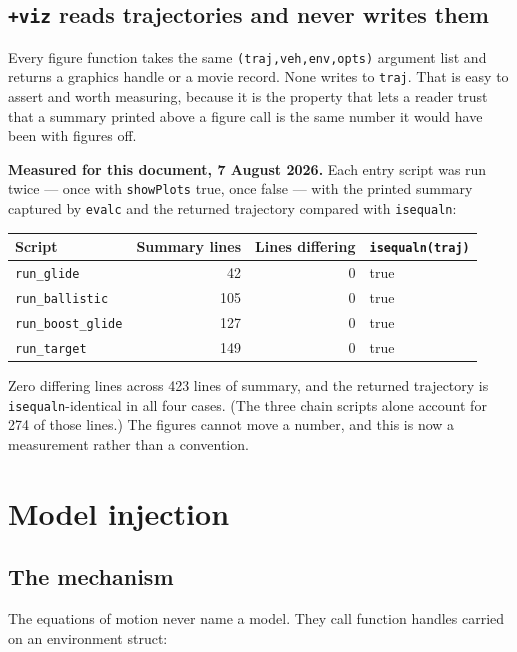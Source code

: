 \documentclass[11pt]{article}
\newcommand{\code}[1]{\texttt{#1}}
\newcommand{\pkg}[1]{\texttt{+#1}}
\begin{document}
\subsection{\pkg{viz} reads trajectories and never writes them}
\label{sec:vizreadonly}

Every figure function takes the same \code{(traj,veh,env,opts)} argument list
and returns a graphics handle or a movie record. None writes to \code{traj}.
That is easy to assert and worth measuring, because it is the property that
lets a reader trust that a summary printed above a figure call is the same
number it would have been with figures off.

\textbf{Measured for this document, 7 August 2026.} Each entry script was run
twice --- once with \code{showPlots} true, once false --- with the printed
summary captured by \code{evalc} and the returned trajectory compared with
\code{isequaln}:

\begin{center}
\begin{tabular}{lrrl}
\toprule
Script & Summary lines & Lines differing & \code{isequaln(traj)} \\
\midrule
\code{run\_glide}       &  42 & 0 & true \\
\code{run\_ballistic}   & 105 & 0 & true \\
\code{run\_boost\_glide}& 127 & 0 & true \\
\code{run\_target}      & 149 & 0 & true \\
\bottomrule
\end{tabular}
\end{center}

Zero differing lines across 423 lines of summary, and the returned trajectory
is \code{isequaln}-identical in all four cases. (The three chain scripts alone
account for 274 of those lines.) The figures cannot move a number, and this is
now a measurement rather than a convention.

\section{Model injection}
\label{sec:inject}

\subsection{The mechanism}

The equations of motion never name a model. They call function handles carried
on an environment struct:
\end{document}
